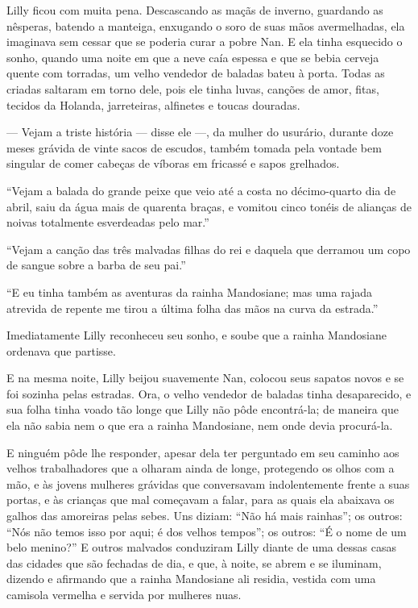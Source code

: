 Lilly ficou com muita pena. Descascando as maçãs de inverno, guardando
as nêsperas, batendo a manteiga, enxugando o soro de suas mãos
avermelhadas, ela imaginava sem cessar que se poderia curar a pobre Nan. E
ela tinha esquecido o sonho, quando uma noite em que a neve caía espessa e
que se bebia cerveja quente com torradas, um velho vendedor de baladas
bateu à porta. Todas as criadas saltaram em torno dele, pois ele tinha
luvas, canções de amor, fitas, tecidos da Holanda, jarreteiras, alfinetes
e toucas douradas.

--- Vejam a triste história --- disse ele ---, da mulher do usurário, durante
doze meses grávida de vinte sacos de escudos, também tomada pela vontade
bem \mbox{singular} de comer cabeças de víboras em fricassé e sapos grelhados.

“Vejam a balada do grande peixe que veio até a costa no décimo-quarto
dia de abril, saiu da água mais de quarenta braças, e vomitou cinco tonéis
de alianças de noivas totalmente esverdeadas pelo mar.”

“Vejam a canção das três malvadas filhas do rei e daquela que derramou
um copo de sangue sobre a barba de seu pai.”

“E eu tinha também as aventuras da rainha Mandosiane; mas uma rajada atrevida
de repente me tirou a última folha das mãos na curva da estrada.”

Imediatamente Lilly reconheceu seu sonho, e soube que a rainha
Mandosiane ordenava que partisse.

E na mesma noite, Lilly beijou suavemente Nan, colocou seus sapatos
novos e se foi sozinha pelas estradas. Ora, o velho vendedor de baladas
tinha desaparecido, e sua folha tinha voado tão longe que Lilly não pôde
encontrá-la; de maneira que ela não sabia nem o que era a rainha
Mandosiane, nem onde devia procurá-la.

E ninguém pôde lhe responder, apesar dela ter perguntado em seu caminho
aos velhos trabalhadores que a olharam ainda de longe, protegendo os olhos
com a mão, e às jovens mulheres grávidas que conversavam indolentemente
frente a suas portas, e às crianças que mal começavam a falar, para as
quais ela abaixava os galhos das amoreiras pelas sebes. Uns diziam: “Não
há mais rainhas”; os outros: “Nós não temos isso por aqui; é dos velhos
tempos”; os outros: “É o nome de um belo menino?” E outros malvados
conduziram Lilly diante de uma dessas casas das cidades que são fechadas
de dia, e que, à noite, se abrem e se iluminam, dizendo e afirmando que a
rainha Mandosiane ali residia, vestida com uma camisola vermelha e servida
por mulheres nuas.

